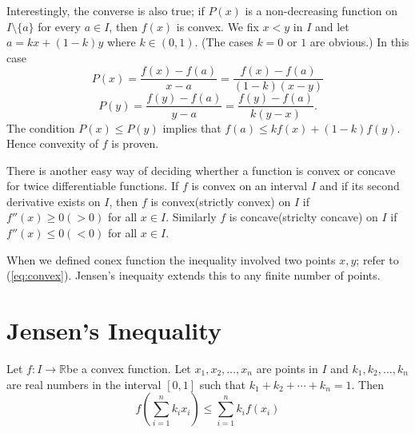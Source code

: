 Interestingly, the converse is also true; if $P(x)$ is a non-decreasing function on $I\setminus\{a\}$ for every $a\in I$, then
$f(x)$ is convex. We fix $x<y$ in $I$ and let $a = kx + (1 - k)y$ where $k\in(0,1)$. (The cases $k = 0$ or $1$ are obvious.) In
this case
$$P(x) = \frac{f(x) - f(a)}{x - a} = \frac{f(x) - f(a)}{(1 - k)(x - y)}$$
$$P(y) = \frac{f(y) - f(a)}{y - a} = \frac{f(y) - f(a)}{k(y - x)}.$$
The condition $P(x)\leq P(y)$ implies that $f(a)\leq kf(x) + (1 - k)f(y).$ Hence convexity of $f$ is proven.

There is another easy way of deciding wherther a function is convex or concave for twice differentiable functions. If $f$ is convex
on an interval $I$ and if its second derivative exists on $I$, then $f$ is convex(strictly convex) on $I$ if $f''(x)\geq 0(> 0)$ for
all $x\in I$. Similarly $f$ is concave(striclty concave) on $I$ if $f''(x)\leq0(<0)$ for all $x\in I$.

When we defined conex function the inequality involved two points $x, y$; refer to (\ref{eq:convex}). Jensen's inequaity extends
this to any finite number of points.

\section{Jensen's Inequality}
\begin{theorem}
  Let $f:I\rightarrow\mathbb{R}$be a convex function. Let $x_1, x_2, \ldots, x_n$ are points in $I$ and $k_1, k_2, \ldots, k_n$ are
  real numbers in the interval $[0, 1]$ such that $k_1 + k_2 + \cdots + k_n = 1$. Then
  \begin{equation}
    \label{eq:jensen}
    f\left(\sum_{i=1}^nk_ix_i\right)\leq\sum_{i=1}^nk_if(x_i)
  \end{equation}
\end{theorem}

